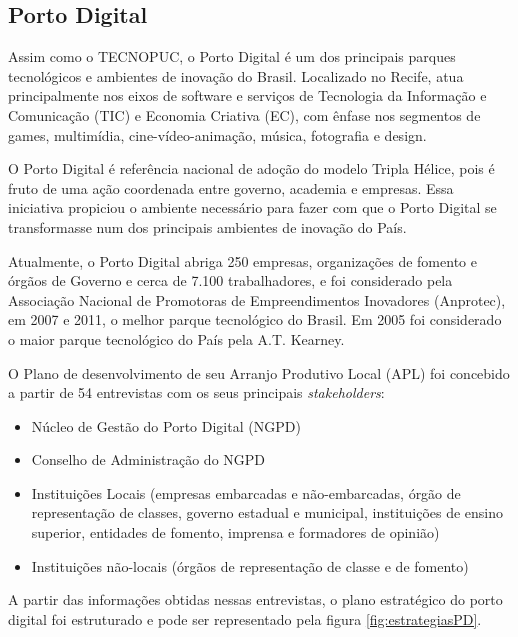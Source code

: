 \subsection{Porto Digital}

Assim como o TECNOPUC, o Porto Digital é um dos principais parques tecnológicos e ambientes de inovação do Brasil. Localizado no Recife, atua principalmente nos eixos de software e serviços de Tecnologia da Informação e Comunicação (TIC) e Economia Criativa (EC), com ênfase nos segmentos de games, multimídia, cine-vídeo-animação, música, fotografia e design.

O Porto Digital é referência nacional de adoção do modelo Tripla Hélice, pois é fruto de uma ação coordenada entre governo, academia e empresas. Essa iniciativa propiciou o ambiente necessário para fazer com que o Porto Digital se transformasse num dos principais ambientes de inovação do País. 

Atualmente, o Porto Digital abriga 250 empresas, organizações de fomento e órgãos de Governo e cerca de 7.100 trabalhadores, e foi considerado pela Associação Nacional de Promotoras de Empreendimentos Inovadores (Anprotec), em 2007 e 2011, o melhor parque tecnológico do Brasil. Em 2005 foi considerado o maior parque tecnológico do País pela A.T. Kearney.

O Plano de desenvolvimento de seu Arranjo Produtivo Local (APL) foi concebido a partir de 54 entrevistas com os seus principais \textit{stakeholders}:

\begin{itemize}
\item Núcleo de Gestão do Porto Digital (NGPD)
\item Conselho de Administração do NGPD
\item Instituições Locais (empresas embarcadas e não-embarcadas, órgão de representação de classes, governo estadual e municipal, instituições de ensino superior, entidades de fomento, imprensa e formadores de opinião)
\item Instituições não-locais (órgãos de representação de classe e de fomento)
\end{itemize}

A partir das informações obtidas nessas entrevistas, o plano estratégico do porto digital foi estruturado e pode ser representado pela figura \ref{fig:estrategiasPD}.

